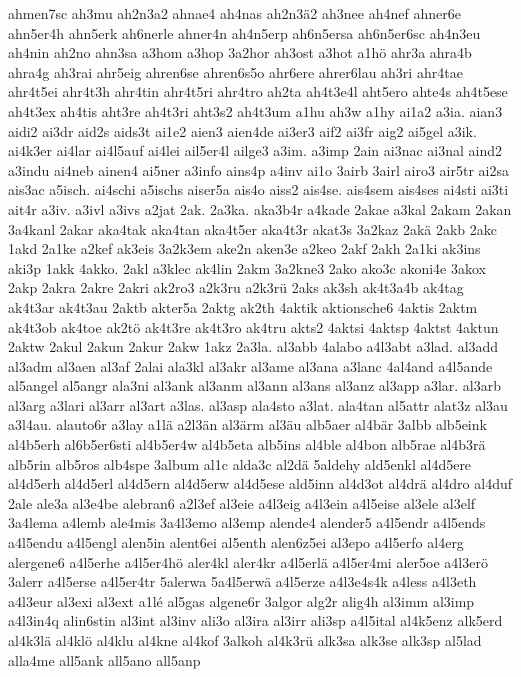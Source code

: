 {ahmen7sc
ah3mu
ah2n3a2
ahnae4
ah4nas
ah2n3ä2
ah3nee
ah4nef
ahner6e
ahn5er4h
ahn5erk
ah6nerle
ahner4n
ah4n5erp
ah6n5ersa
ah6n5er6sc
ah4n3eu
ah4nin
ah2no
ahn3sa
a3hom
a3hop
3a2hor
ah3ost
a3hot
a1hö
ahr3a
ahra4b
ahra4g
ah3rai
ahr5eig
ahren6se
ahren6s5o
ahr6ere
ahrer6lau
ah3ri
ahr4tae
ahr4t5ei
ahr4t3h
ahr4tin
ahr4t5ri
ahr4tro
ah2ta
ah4t3e4l
aht5ero
ahte4s
ah4t5ese
ah4t3ex
ah4tis
aht3re
ah4t3ri
aht3s2
ah4t3um
a1hu
ah3w
a1hy
ai1a2
a3ia.
aian3
aidi2
ai3dr
aid2s
aids3t
ai1e2
aien3
aien4de
ai3er3
aif2
ai3fr
aig2
ai5gel
a3ik.
ai4k3er
ai4lar
ai4l5auf
ai4lei
ail5er4l
ailge3
a3im.
a3imp
2ain
ai3nac
ai3nal
aind2
a3indu
ai4neb
ainen4
ai5ner
a3info
ains4p
a4inv
ai1o
3airb
3airl
airo3
air5tr
ai2sa
ais3ac
a5isch.
ai4schi
a5ischs
aiser5a
ais4o
aiss2
ais4se.
ais4sem
ais4ses
ai4sti
ai3ti
ait4r
a3iv.
a3ivl
a3ivs
a2jat
2ak.
2a3ka.
aka3b4r
a4kade
2akae
a3kal
2akam
2akan
3a4kanl
2akar
aka4tak
aka4tan
aka4t5er
aka4t3r
akat3s
3a2kaz
2akä
2akb
2akc
1akd
2a1ke
a2kef
ak3eis
3a2k3em
ake2n
aken3e
a2keo
2akf
2akh
2a1ki
ak3ins
aki3p
1akk
4akko.
2akl
a3klec
ak4lin
2akm
3a2kne3
2ako
ako3c
akoni4e
3akox
2akp
2akra
2akre
2akri
ak2ro3
a2k3ru
a2k3rü
2aks
ak3sh
ak4t3a4b
ak4tag
ak4t3ar
ak4t3au
2aktb
akter5a
2aktg
ak2th
4aktik
aktionsche6
4aktis
2aktm
ak4t3ob
ak4toe
ak2tö
ak4t3re
ak4t3ro
ak4tru
akts2
4aktsi
4aktsp
4aktst
4aktun
2aktw
2akul
2akun
2akur
2akw
1akz
2a3la.
al3abb
4alabo
a4l3abt
a3lad.
al3add
al3adm
al3aen
al3af
2alai
ala3kl
al3akr
al3ame
al3ana
a3lanc
4al4and
a4l5ande
al5angel
al5angr
ala3ni
al3ank
al3anm
al3ann
al3ans
al3anz
al3app
a3lar.
al3arb
al3arg
a3lari
al3arr
al3art
a3las.
al3asp
ala4sto
a3lat.
ala4tan
al5attr
alat3z
al3au
a3l4au.
alauto6r
a3lay
a1lä
a2l3än
al3ärm
al3äu
alb5aer
al4bär
3albb
alb5eink
al4b5erh
al6b5er6sti
al4b5er4w
al4b5eta
alb5ins
al4ble
al4bon
alb5rae
al4b3rä
alb5rin
alb5ros
alb4spe
3album
al1c
alda3c
al2dä
5aldehy
ald5enkl
al4d5ere
al4d5erh
al4d5erl
al4d5ern
al4d5erw
al4d5ese
ald5inn
al4d3ot
al4drä
al4dro
al4duf
2ale
ale3a
al3e4be
alebran6
a2l3ef
al3eie
a4l3eig
a4l3ein
a4l5eise
al3ele
al3elf
3a4lema
a4lemb
ale4mis
3a4l3emo
al3emp
alende4
alender5
a4l5endr
a4l5ends
a4l5endu
a4l5engl
alen5in
alent6ei
al5enth
alen6z5ei
al3epo
a4l5erfo
al4erg
alergene6
a4l5erhe
a4l5er4hö
aler4kl
aler4kr
a4l5erlä
a4l5er4mi
aler5oe
a4l3erö
3alerr
a4l5erse
a4l5er4tr
5alerwa
5a4l5erwä
a4l5erze
a4l3e4s4k
a4less
a4l3eth
a4l3eur
al3exi
al3ext
a1lé
al5gas
algene6r
3algor
alg2r
alig4h
al3imm
al3imp
a4l3in4q
alin6stin
al3int
al3inv
ali3o
al3ira
al3irr
ali3sp
a4l5ital
al4k5enz
alk5erd
al4k3lä
al4klö
al4klu
al4kne
al4kof
3alkoh
al4k3rü
alk3sa
alk3se
alk3sp
al5lad
alla4me
all5ank
all5ano
all5anp
}

